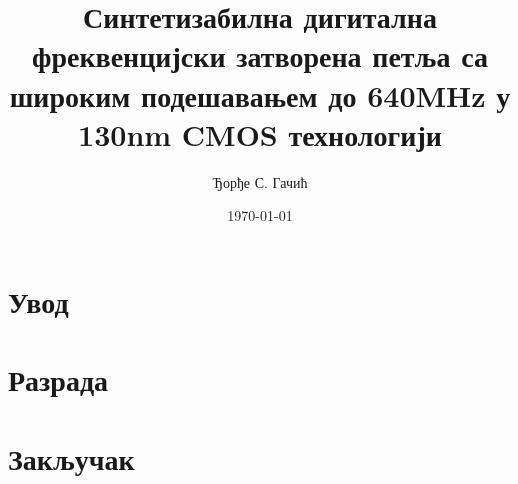 \documentclass[master]{finthesis}
\title{Синтетизабилна дигитална фреквенцијски затворена петља са широким подешавањем до 640MHz у 130nm CMOS технологији}
\author{Ђорђе С. Гачић}
\date{\today}
\begin{document}
\maketitle

\tableofcontents

\makeabstract

\section{Увод}

\section{Разрада}
\cite{Staszewski:FREQUENCY_SYNTHESIZER_CMOS_2005}

\section{Закључак}

\makebibliography
\end{document}
